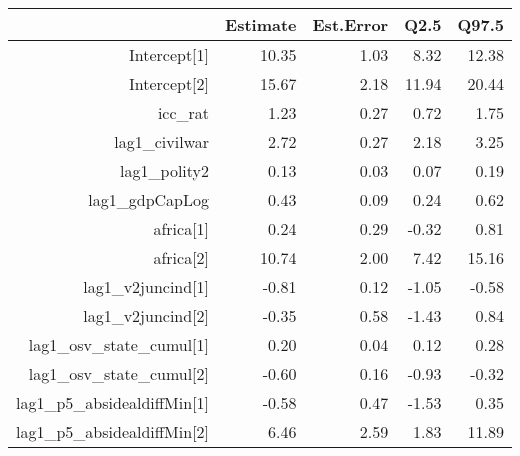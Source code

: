 \begin{table}[ht]
\centering
\begin{tabular}{rrrrr}
  \hline
 & Estimate & Est.Error & Q2.5 & Q97.5 \\ 
  \hline
Intercept[1] & 10.35 & 1.03 & 8.32 & 12.38 \\ 
  Intercept[2] & 15.67 & 2.18 & 11.94 & 20.44 \\ 
  icc\_rat & 1.23 & 0.27 & 0.72 & 1.75 \\ 
  lag1\_civilwar & 2.72 & 0.27 & 2.18 & 3.25 \\ 
  lag1\_polity2 & 0.13 & 0.03 & 0.07 & 0.19 \\ 
  lag1\_gdpCapLog & 0.43 & 0.09 & 0.24 & 0.62 \\ 
  africa[1] & 0.24 & 0.29 & -0.32 & 0.81 \\ 
  africa[2] & 10.74 & 2.00 & 7.42 & 15.16 \\ 
  lag1\_v2juncind[1] & -0.81 & 0.12 & -1.05 & -0.58 \\ 
  lag1\_v2juncind[2] & -0.35 & 0.58 & -1.43 & 0.84 \\ 
  lag1\_osv\_state\_cumul[1] & 0.20 & 0.04 & 0.12 & 0.28 \\ 
  lag1\_osv\_state\_cumul[2] & -0.60 & 0.16 & -0.93 & -0.32 \\ 
  lag1\_p5\_absidealdiffMin[1] & -0.58 & 0.47 & -1.53 & 0.35 \\ 
  lag1\_p5\_absidealdiffMin[2] & 6.46 & 2.59 & 1.83 & 11.89 \\ 
   \hline
\end{tabular}
\end{table}
